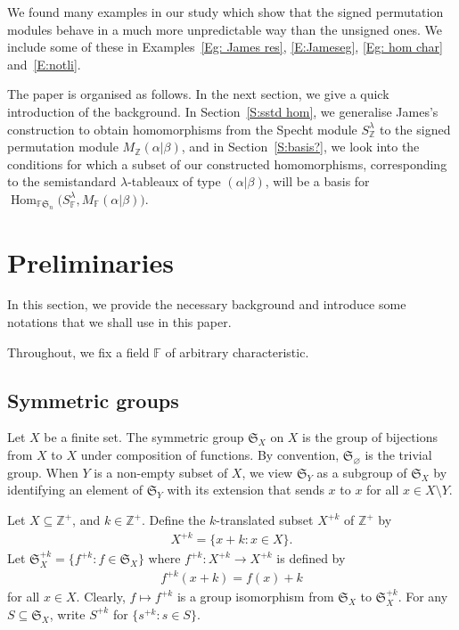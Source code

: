 \documentclass[pdftex]{sigma}
\newcommand{\Hom}{\operatorname{Hom}}
\newcommand{\sym}[1]{\mathfrak{S}_{#1}}
\newcommand{\F}{\mathbb{F}}
\newcommand{\tl}[2]{{#1}^{+#2}} %
\newcommand{\tlsym}[2]{\mathfrak{S}_{#1}^{+#2}}
\newcommand{\Z}{\mathbb{Z}}
\begin{document}
We found many examples in our study which show that the signed permutation modules behave in a much more unpredictable way than the unsigned ones. We include some of these in Examples~\ref{Eg: James res}, \ref{E:Jameseg}, \ref{Eg: hom char} and~\ref{E:notli}.

The paper is organised as follows. In the next section, we give a quick introduction of the background.
In Section~\ref{S:sstd hom}, we generalise James's construction to obtain homomorphisms from the Specht module $S_\Z^{\lambda}$ to the signed permutation module $M_\Z(\alpha|\beta)$, and in Section~\ref{S:basis?}, we look into the conditions for which a subset of our constructed homomorphisms, corresponding to the semistandard $\lambda$-tableaux of type $(\alpha|\beta)$, will be a basis for $\Hom_{\F\sym{n}}\big(S^{\lambda}_\F, M_\F(\alpha|\beta)\big)$.

\section{Preliminaries}

In this section, we provide the necessary background and introduce some notations that we shall use in this paper.

Throughout, we fix a field $\F$ of arbitrary characteristic.

\subsection{Symmetric groups}

Let $X$ be a finite set. The symmetric group $\sym{X}$ on $X$ is the group of bijections from $X$ to $X$ under composition of functions. By convention, $\sym{\varnothing}$ is the trivial group. When $Y$ is a non-empty subset of $X$, we view $\sym{Y}$ as a subgroup of $\sym{X}$ by identifying an element of $\sym{Y}$ with its extension that sends $x$ to $x$ for all $x \in X \setminus Y$.

Let $X \subseteq \mathbb{Z}^+$, and $k \in \mathbb{Z}^+$. Define the $k$-translated subset $\tl{X}{k}$ of $\mathbb{Z}^+$ by
\begin{gather*}\tl{X}{k} = \{ x+ k\colon x \in X \}. \end{gather*}
Let $\tlsym{X}{k}=\big\{\tl{f}{k}\colon f\in\sym{X}\big\}$ where $\tl{f}{k}\colon \tl{X}{k}\to\tl{X}{k}$ is defined by
\begin{gather*}
\tl{f}{k}(x+k) = f(x) + k
\end{gather*}
for all $x \in X$. Clearly, $f \mapsto \tl{f}{k}$ is a group isomorphism from $\sym{X}$ to $\tlsym{X}{k}$. For any $S \subseteq \sym{X}$, write $\tl{S}{k}$ for $\{ \tl{s}{k}\colon s \in S\}$.
\end{document}
